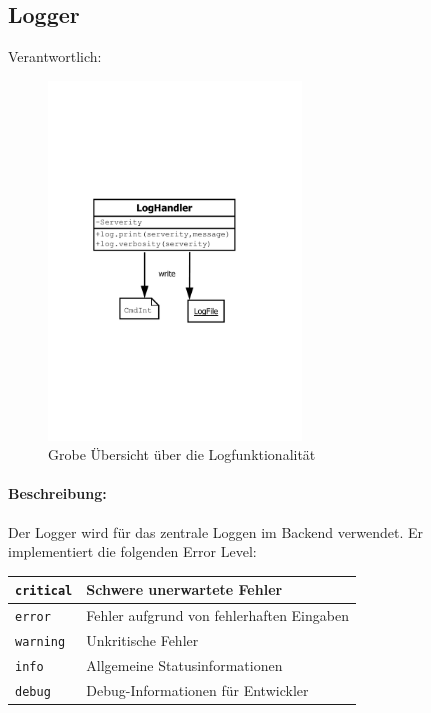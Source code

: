 \newpage
\subsection{Logger}
\label{sub:logger}
Verantwortlich: \flo 
\begin{figure}[H]
    \centering    
    \includegraphics[width=0.6\textwidth]{design/backend/gfx/LogHandler.pdf}
    \caption{Grobe Übersicht über die Logfunktionalität}
\end{figure}

\paragraph{Beschreibung:}
\label{par:beschreibung}

Der Logger wird für das zentrale Loggen im Backend verwendet. Er implementiert die folgenden Error Level:

\begin{table}[h]
\centering
\begin{tabular}{|l|l|}
    \hline
    \texttt{critical} & Schwere unerwartete Fehler \\
    \hline
    \texttt{error} & Fehler aufgrund von fehlerhaften Eingaben \\
    \hline
    \texttt{warning} & Unkritische Fehler \\
    \hline
    \texttt{info} & Allgemeine Statusinformationen \\
    \hline
    \texttt{debug} & Debug-Informationen für Entwickler \\
    \hline
\end{tabular} 
\end{table}


